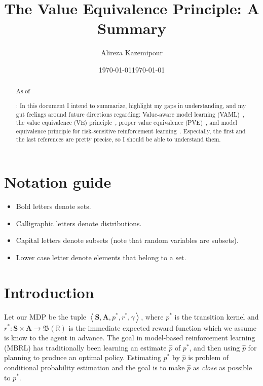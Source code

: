 \documentclass[a4paper]{article}
\title{The Value Equivalence Principle: A Summary}
\author{Alireza Kazemipour}
\date{\today}
\theoremstyle{definition}
\theoremstyle{remark}
\theoremstyle{plain}
\newcommand{\bA}{\mathbf{A}}
\newcommand{\bS}{\mathbf{S}}
\newcommand{\fB}{\mathfrak{B}}
\newcommand{\R}{\mathbb{R}}
\begin{document}
\maketitle

\begin{abstract}
    As of \date{\today}: In this document I intend to summarize, highlight my gaps in understanding, and my gut feelings around future directions regarding: Value-aware model learning (VAML)~\citep{farahmand2017value}, the value equivalence (VE) principle~\citep{grimm2020value}, proper value equivalence (PVE)~\citep{grimm2021proper}, and model equivalence principle for risk-sensitive reinforcement learning~\citep{kastner2023distributional}. Especially, the first and the last references are pretty precise, so I should be able to understand them.
\end{abstract}

\section*{Notation guide}
\begin{itemize}
    \item Bold letters denote sets.
    \item Calligraphic letters denote distributions.
    \item Capital letters denote subsets (note that random variables are subsets).
    \item Lower case letter denote elements that belong to a set.
\end{itemize}
    
\section{Introduction}
\label{sec:intro}
Let our MDP be the tuple $\left \langle \bS, \bA, p^*, r^*, \gamma \right \rangle$, where $p^*$ is the transition kernel and $r^*: \bS \times \bA \to \fB(\R)$ is the immediate expected reward function which we assume is know to the agent in advance. The goal in model-based reinforcement learning (MBRL) has traditionally been learning an estimate $\hat{p}$ of $p^*$, and then using $\hat{p}$ for planning to produce an optimal policy. Estimating $p^*$ by $\hat{p}$ is problem of conditional probability estimation and the goal is to make $\hat{p}$ as \emph{close} as possible to $p^*$. 
\end{document}
